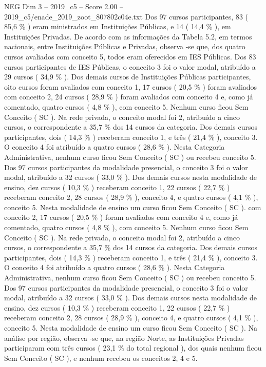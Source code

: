 \begin{textsample}{NEG Dim 3 – 2019\_c5 – Score 2.00 – 2019\_c5/enade\_2019\_zoot\_807802c04e.txt}
Dos 97 cursos participantes, 83 ( 85,6 \% ) eram ministrados em Instituições Públicas, e 14 ( 14,4 \% ), em Instituições Privadas.
De acordo com as informações da Tabela 5.2, em termos nacionais, entre Instituições Públicas e Privadas, observa -se que, dos quatro cursos avaliados com conceito 5, todos eram oferecidos em IES Públicas.
Dos 83 cursos participantes de IES Públicas, o conceito 3 foi o valor modal, atribuído a 29 cursos ( 34,9 \% ).
Dos demais cursos de Instituições Públicas participantes, oito cursos foram avaliados com conceito 1, 17 cursos ( 20,5 \% ) foram avaliados com conceito 2, 24 cursos ( 28,9 \% ) foram avaliados com conceito 4 e, como já comentado, quatro cursos ( 4,8 \% ), com conceito 5.
Nenhum curso ficou Sem Conceito ( SC ).
Na rede privada, o conceito modal foi 2, atribuído a cinco cursos, o correspondente a 35,7 \% dos 14 cursos da categoria.
Dos demais cursos participantes, dois ( 14,3 \% ) receberam conceito 1, e três ( 21,4 \% ), conceito 3.
O conceito 4 foi atribuído a quatro cursos ( 28,6 \% ).
Nesta Categoria Administrativa, nenhum curso ficou Sem Conceito ( SC ) ou recebeu conceito 5.
Dos 97 cursos participantes da modalidade presencial, o conceito 3 foi o valor modal, atribuído a 32 cursos ( 33,0 \% ).
Dos demais cursos nesta modalidade de ensino, dez cursos ( 10,3 \% ) receberam conceito 1, 22 cursos ( 22,7 \% ) receberam conceito 2, 28 cursos ( 28,9 \% ), conceito 4, e quatro cursos ( 4,1 \% ), conceito 5.
Nesta modalidade de ensino um curso ficou Sem Conceito ( SC ). com conceito 2, 17 cursos ( 20,5 \% ) foram avaliados com conceito 4 e, como já comentado, quatro cursos ( 4,8 \% ), com conceito 5.
Nenhum curso ficou Sem Conceito ( SC ).
Na rede privada, o conceito modal foi 2, atribuído a cinco cursos, o correspondente a 35,7 \% dos 14 cursos da categoria.
Dos demais cursos participantes, dois ( 14,3 \% ) receberam conceito 1, e três ( 21,4 \% ), conceito 3.
O conceito 4 foi atribuído a quatro cursos ( 28,6 \% ).
Nesta Categoria Administrativa, nenhum curso ficou Sem Conceito ( SC ) ou recebeu conceito 5.
Dos 97 cursos participantes da modalidade presencial, o conceito 3 foi o valor modal, atribuído a 32 cursos ( 33,0 \% ).
Dos demais cursos nesta modalidade de ensino, dez cursos ( 10,3 \% ) receberam conceito 1, 22 cursos ( 22,7 \% ) receberam conceito 2, 28 cursos ( 28,9 \% ), conceito 4, e quatro cursos ( 4,1 \% ), conceito 5.
Nesta modalidade de ensino um curso ficou Sem Conceito ( SC ).
Na análise por região, observa -se que, na região Norte, as Instituições Privadas participaram com três cursos ( 23,1 \% do total regional ), dos quais nenhum ficou Sem Conceito ( SC ), e nenhum recebeu os conceitos 2, 4 e 5.

\end{textsample}

